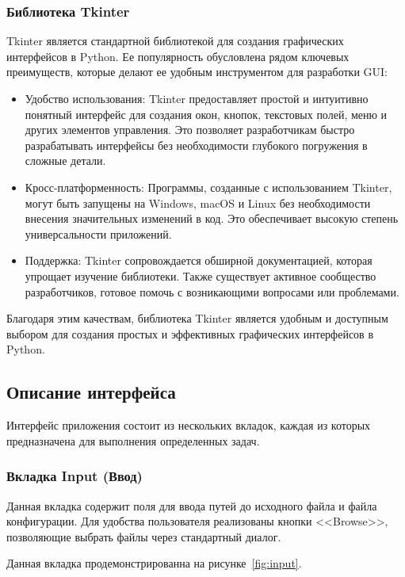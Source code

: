 \subsubsection{Библиотека Tkinter}

Tkinter является стандартной библиотекой
для создания графических интерфейсов в Python.
Ее популярность обусловлена рядом ключевых преимуществ,
которые делают ее удобным инструментом для разработки GUI:

\begin{itemize}
	\item Удобство использования:
		Tkinter предоставляет простой и интуитивно понятный интерфейс
		для создания окон, кнопок, текстовых полей,
		меню и других элементов управления.
		Это позволяет разработчикам быстро разрабатывать интерфейсы
		без необходимости глубокого погружения в сложные детали.
	\item Кросс-платформенность:
		Программы, созданные с использованием Tkinter,
		могут быть запущены на Windows, macOS и Linux
		без необходимости внесения значительных изменений в код.
		Это обеспечивает высокую степень универсальности приложений.
	\item Поддержка: Tkinter сопровождается обширной документацией,
		которая упрощает изучение библиотеки.
		Также существует активное сообщество разработчиков,
		готовое помочь с возникающими вопросами или проблемами.
\end{itemize}

Благодаря этим качествам,
библиотека Tkinter является удобным и доступным выбором
для создания простых и эффективных графических интерфейсов в Python.

\subsection{Описание интерфейса}

Интерфейс приложения состоит из нескольких вкладок,
каждая из которых предназначена для выполнения определенных задач.

\subsubsection{Вкладка Input (Ввод)}

Данная вкладка содержит поля для ввода путей до исходного файла
и файла конфигурации.
Для удобства пользователя реализованы кнопки <<Browse>>,
позволяющие выбрать файлы через стандартный диалог.

Данная вкладка продемонстрированна на рисунке~\ref{fig:input}.

